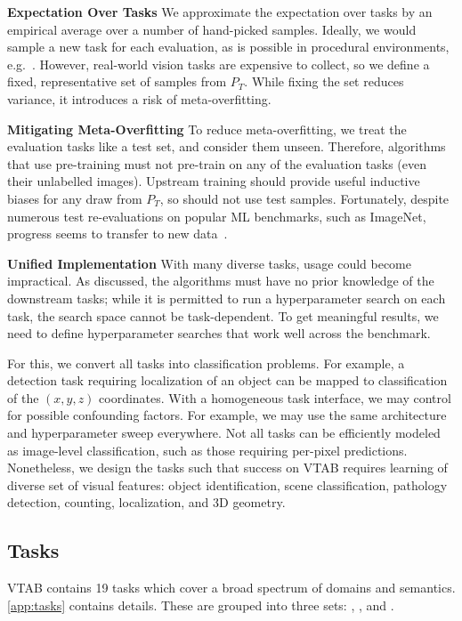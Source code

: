 \textbf{Expectation Over Tasks}\quad
We approximate the expectation over tasks by an empirical average over a number of hand-picked samples. Ideally, we would sample a new task for each evaluation, as is possible in procedural environments, e.g.~\citep{finn2017}. However, real-world vision tasks are expensive to collect, so we define a fixed, representative set of samples from $P_{T}$. While fixing the set reduces variance, it introduces a risk of meta-overfitting.

\textbf{Mitigating Meta-Overfitting}\quad
To reduce meta-overfitting, we treat the evaluation tasks like a test set, and consider them unseen. Therefore, algorithms that use pre-training must not pre-train on any of the evaluation tasks (even their unlabelled images). Upstream training should provide useful inductive biases for any draw from $P_{T}$, so should not use test samples. Fortunately, despite numerous test re-evaluations on popular ML benchmarks, such as ImageNet, progress seems to transfer to new data~\citep{recht18cifar,recht19imagenet,kornblith2018better}.

\textbf{Unified Implementation}\quad
With many diverse tasks, usage could become impractical. As discussed, the algorithms must have no prior knowledge of the downstream tasks; while it is permitted to run a hyperparameter search on each task, the search space cannot be task-dependent. To get meaningful results, we need to define hyperparameter searches that work well across the benchmark.

For this, we convert all tasks into classification problems. For example, a detection task requiring localization of an object can be mapped to classification of the $(x,y,z)$ coordinates. With a homogeneous task interface, we may control for possible confounding factors. For example, we may use the same architecture and hyperparameter sweep everywhere. Not all tasks can be efficiently modeled as image-level classification, such as those requiring per-pixel predictions. Nonetheless, we design the tasks such that success on VTAB requires learning of diverse set of visual features: object identification, scene classification, pathology detection, counting, localization, and 3D geometry.

\subsection{Tasks\label{sec:tasks}}
VTAB contains 19  tasks which cover a broad spectrum of domains and semantics. \ref{app:tasks} contains details. These are grouped into three sets: \taskNatural{}, \taskSpecialized{}, and \taskStructured{}.

